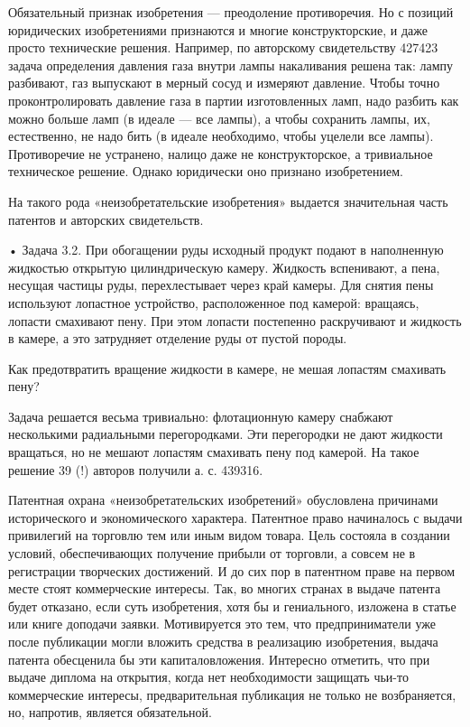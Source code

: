 Обязательный  признак изобретения  —  преодоление  противоречия. Но  с
позиций юридических изобретениями признаются и многие конструкторские,
и   даже  просто   технические   решения.   Например,  по   авторскому
свидетельству  427423 задача  определения давления  газа внутри  лампы
накаливания решена так: лампу разбивают,  газ выпускают в мерный сосуд
и  измеряют давление.  Чтобы точно  проконтролировать давление  газа в
партии  изготовленных ламп,  надо  разбить как  можно  больше ламп  (в
идеале — все лампы), а чтобы сохранить лампы, их, естественно, не надо
бить (в идеале  необходимо, чтобы уцелели все  лампы). Противоречие не
устранено, налицо  даже не конструкторское, а  тривиальное техническое
решение. Однако юридически оно признано изобретением.

На такого рода  «неизобретательские изобретения» выдается значительная
часть патентов и авторских свидетельств.

•  Задача  3.2.   При  обогащении  руды  исходный   продукт  подают  в
наполненную   жидкостью  открытую   цилиндрическую  камеру.   Жидкость
вспенивают, а  пена, несущая  частицы руды, перехлестывает  через край
камеры. Для снятия пены используют лопастное устройство, расположенное
под  камерой:  вращаясь,  лопасти  смахивают пену.  При  этом  лопасти
постепенно  раскручивают  и  жидкость   в  камере,  а  это  затрудняет
отделение руды от пустой породы.

Как  предотвратить  вращение  жидкости  в камере,  не  мешая  лопастям
смахивать пену?

Задача  решается  весьма   тривиально:  флотационную  камеру  снабжают
несколькими  радиальными   перегородками.  Эти  перегородки   не  дают
жидкости вращаться, но не мешают  лопастям смахивать пену под камерой.
На такое решение 39 (!) авторов получили а. с. 439316.

Патентная   охрана    «неизобретательских   изобретений»   обусловлена
причинами  исторического и  экономического характера.  Патентное право
начиналось с выдачи привилегий на  торговлю тем или иным видом товара.
Цель состояла в создании  условий, обеспечивающих получение прибыли от
торговли, а  совсем не в  регистрации творческих достижений. И  до сих
пор в  патентном праве  на первом  месте стоят  коммерческие интересы.
Так,  во многих  странах в  выдаче патента  будет отказано,  если суть
изобретения,  хотя  бы и  гениального,  изложена  в статье  или  книге
доподачи заявки.  Мотивируется это тем, что  предприниматели уже после
публикации  могли вложить  средства в  реализацию изобретения,  выдача
патента обесценила  бы эти  капиталовложения. Интересно  отметить, что
при  выдаче  диплома на  открытия,  когда  нет необходимости  защищать
чьи-то коммерческие интересы, предварительная  публикация не только не
возбраняется, но, напротив, является обязательной.

